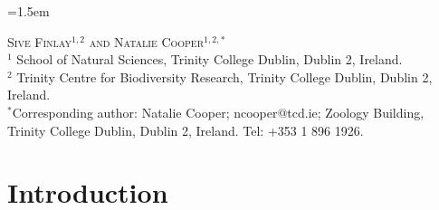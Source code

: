 \documentclass[12pt,a4paper]{article}
\begin{document}
\parindent=1.5em		
\addtolength{\parskip}{.3em} 
\doublespace



\noindent
\textsc{Sive Finlay$^{1,2}$ and Natalie Cooper$^{1,2,*}$}\\

\noindent
$^1$ School of Natural Sciences, Trinity College Dublin, Dublin 2, Ireland.\\ 
\noindent
$^2$ Trinity Centre for Biodiversity Research, Trinity College Dublin, Dublin 2, Ireland.\\
\noindent
$^*$Corresponding author: Natalie Cooper; ncooper@tcd.ie; Zoology Building, Trinity College Dublin, Dublin 2, Ireland. Tel: +353 1 896 1926.\\


	
	

\newpage
\section{Introduction}
\end{document}
